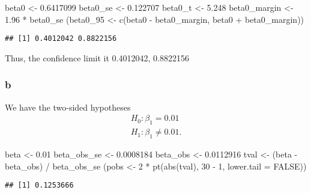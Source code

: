 \documentclass[
]{article}
\newenvironment{Shaded}{\begin{snugshade}}{\end{snugshade}}
\newcommand{\AttributeTok}[1]{\textcolor[rgb]{0.77,0.63,0.00}{#1}}
\newcommand{\ConstantTok}[1]{\textcolor[rgb]{0.00,0.00,0.00}{#1}}
\newcommand{\DecValTok}[1]{\textcolor[rgb]{0.00,0.00,0.81}{#1}}
\newcommand{\FloatTok}[1]{\textcolor[rgb]{0.00,0.00,0.81}{#1}}
\newcommand{\FunctionTok}[1]{\textcolor[rgb]{0.00,0.00,0.00}{#1}}
\newcommand{\NormalTok}[1]{#1}
\newcommand{\OtherTok}[1]{\textcolor[rgb]{0.56,0.35,0.01}{#1}}
\newcommand{\SpecialCharTok}[1]{\textcolor[rgb]{0.00,0.00,0.00}{#1}}
\begin{document}
\begin{Shaded}
\begin{Highlighting}[]
\NormalTok{beta0 }\OtherTok{\textless{}{-}} \FloatTok{0.6417099}
\NormalTok{beta0\_se }\OtherTok{\textless{}{-}} \FloatTok{0.122707}
\NormalTok{beta0\_t }\OtherTok{\textless{}{-}} \FloatTok{5.248}
\NormalTok{beta0\_margin }\OtherTok{\textless{}{-}} \FloatTok{1.96} \SpecialCharTok{*}\NormalTok{ beta0\_se}
\NormalTok{(beta0\_95 }\OtherTok{\textless{}{-}} \FunctionTok{c}\NormalTok{(beta0 }\SpecialCharTok{{-}}\NormalTok{ beta0\_margin, beta0 }\SpecialCharTok{+}\NormalTok{ beta0\_margin))}
\end{Highlighting}
\end{Shaded}

\begin{verbatim}
## [1] 0.4012042 0.8822156
\end{verbatim}

Thus, the confidence limit it 0.4012042, 0.8822156

\hypertarget{b-2}{%
\subsubsection*{b}\label{b-2}}

We have the two-sided hypotheses \[\begin{gathered}
H_0: \beta_1 = 0.01\\
H_1: \beta_1 \neq 0.01.
\end{gathered}\]

\begin{Shaded}
\begin{Highlighting}[]
\NormalTok{beta }\OtherTok{\textless{}{-}} \FloatTok{0.01}
\NormalTok{beta\_obs\_se }\OtherTok{\textless{}{-}} \FloatTok{0.0008184}
\NormalTok{beta\_obs }\OtherTok{\textless{}{-}} \FloatTok{0.0112916}
\NormalTok{tval }\OtherTok{\textless{}{-}}\NormalTok{ (beta }\SpecialCharTok{{-}}\NormalTok{ beta\_obs) }\SpecialCharTok{/}\NormalTok{ beta\_obs\_se}
\NormalTok{(pobs }\OtherTok{\textless{}{-}} \DecValTok{2} \SpecialCharTok{*} \FunctionTok{pt}\NormalTok{(}\FunctionTok{abs}\NormalTok{(tval), }\DecValTok{30} \SpecialCharTok{{-}} \DecValTok{1}\NormalTok{, }\AttributeTok{lower.tail =} \ConstantTok{FALSE}\NormalTok{))}
\end{Highlighting}
\end{Shaded}

\begin{verbatim}
## [1] 0.1253666
\end{verbatim}
\end{document}
